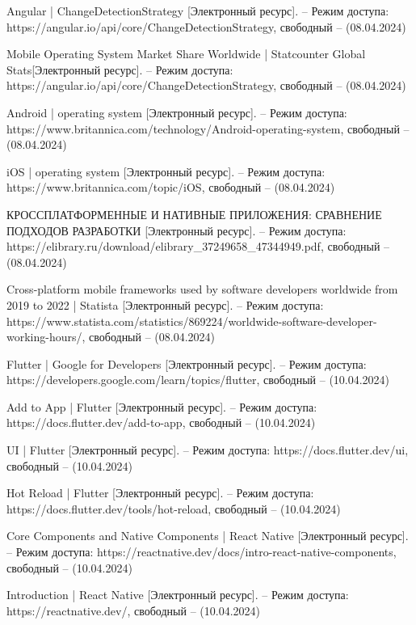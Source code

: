 \begin{thebibliography}{}
	Angular | ChangeDetectionStrategy [Электронный ресурс]. – Режим доступа: https://angular.io/api/core/ChangeDetectionStrategy,
	свободный – (08.04.2024)
	
	Mobile Operating System Market Share Worldwide | Statcounter Global Stats[Электронный ресурс]. – Режим доступа: https://angular.io/api/core/ChangeDetectionStrategy,
	свободный – (08.04.2024)	
	
	Android | operating system [Электронный ресурс]. – Режим доступа: https://www.britannica.com/technology/Android-operating-system,
	свободный – (08.04.2024)
	
	iOS | operating system [Электронный ресурс]. – Режим доступа: https://www.britannica.com/topic/iOS,
	свободный – (08.04.2024)	
	
	КРОССПЛАТФОРМЕННЫЕ И НАТИВНЫЕ ПРИЛОЖЕНИЯ: СРАВНЕНИЕ ПОДХОДОВ РАЗРАБОТКИ  [Электронный ресурс]. – Режим доступа: https://elibrary.ru/download/elibrary\_37249658\_47344949.pdf, 
	свободный – (08.04.2024)
	
	Cross-platform mobile frameworks used by software developers worldwide from 2019 to 2022 | Statista [Электронный ресурс]. – Режим доступа: https://www.statista.com/statistics/869224/worldwide-software-developer-working-hours/, 
	свободный – (08.04.2024)
	
	Flutter | Google for Developers [Электронный ресурс]. – Режим доступа: https://developers.google.com/learn/topics/flutter,
	свободный – (10.04.2024)
	
	Add to App | Flutter [Электронный ресурс]. – Режим доступа: https://docs.flutter.dev/add-to-app,
	свободный – (10.04.2024)
	
	UI | Flutter [Электронный ресурс]. – Режим доступа: https://docs.flutter.dev/ui,
	свободный – (10.04.2024)
	
	Hot Reload | Flutter [Электронный ресурс]. – Режим доступа: https://docs.flutter.dev/tools/hot-reload,
	свободный – (10.04.2024)
	
	Core Components and Native Components | React Native [Электронный ресурс]. – Режим доступа: https://reactnative.dev/docs/intro-react-native-components,
	свободный – (10.04.2024)
	
	Introduction | React Native [Электронный ресурс]. – Режим доступа: https://reactnative.dev/, 
	свободный – (10.04.2024)
	

\end{thebibliography}
